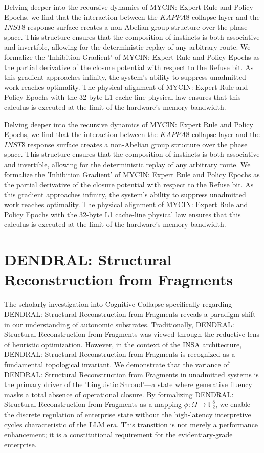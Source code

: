 \documentclass[12pt,a4paper,oneside]{book}
\begin{document}
Delving deeper into the recursive dynamics of MYCIN: Expert Rule and Policy Epochs, we find that the interaction between the $KAPPA8$ collapse layer and the $INST8$ response surface creates a non-Abelian group structure over the phase space. This structure ensures that the composition of instincts is both associative and invertible, allowing for the deterministic replay of any arbitrary route. We formalize the 'Inhibition Gradient' of MYCIN: Expert Rule and Policy Epochs as the partial derivative of the closure potential with respect to the Refuse bit. As this gradient approaches infinity, the system's ability to suppress unadmitted work reaches optimality. The physical alignment of MYCIN: Expert Rule and Policy Epochs with the 32-byte L1 cache-line physical law ensures that this calculus is executed at the limit of the hardware's memory bandwidth. 

Delving deeper into the recursive dynamics of MYCIN: Expert Rule and Policy Epochs, we find that the interaction between the $KAPPA8$ collapse layer and the $INST8$ response surface creates a non-Abelian group structure over the phase space. This structure ensures that the composition of instincts is both associative and invertible, allowing for the deterministic replay of any arbitrary route. We formalize the 'Inhibition Gradient' of MYCIN: Expert Rule and Policy Epochs as the partial derivative of the closure potential with respect to the Refuse bit. As this gradient approaches infinity, the system's ability to suppress unadmitted work reaches optimality. The physical alignment of MYCIN: Expert Rule and Policy Epochs with the 32-byte L1 cache-line physical law ensures that this calculus is executed at the limit of the hardware's memory bandwidth. 

\section{DENDRAL: Structural Reconstruction from Fragments}
The scholarly investigation into Cognitive Collapse specifically regarding DENDRAL: Structural Reconstruction from Fragments reveals a paradigm shift in our understanding of autonomic substrates. Traditionally, DENDRAL: Structural Reconstruction from Fragments was viewed through the reductive lens of heuristic optimization. However, in the context of the INSA architecture, DENDRAL: Structural Reconstruction from Fragments is recognized as a fundamental topological invariant. We demonstrate that the variance of DENDRAL: Structural Reconstruction from Fragments in unadmitted systems is the primary driver of the 'Linguistic Shroud'---a state where generative fluency masks a total absence of operational closure. By formalizing DENDRAL: Structural Reconstruction from Fragments as a mapping $\phi: \Omega \to \mathbb{F}_2^8$, we enable the discrete regulation of enterprise state without the high-latency interpretive cycles characteristic of the LLM era. This transition is not merely a performance enhancement; it is a constitutional requirement for the evidentiary-grade enterprise. 
\end{document}
